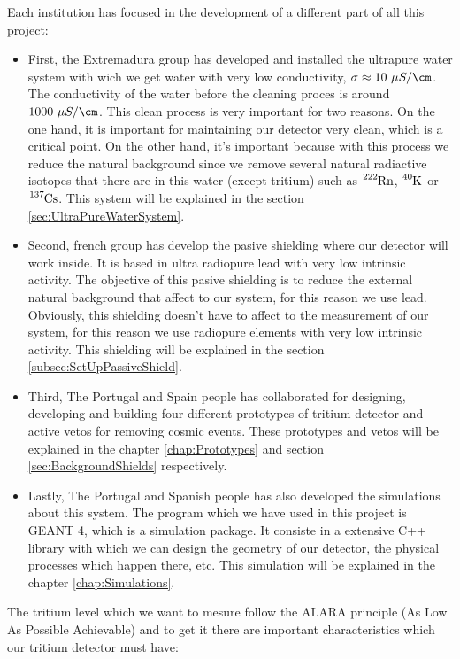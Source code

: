 Each institution has focused in the development of a different part of all this project:
\begin{itemize}
\item{} First, the Extremadura group has developed and installed the ultrapure water system with wich we get water with very low conductivity, $\sigma \approx 10 ~\mu S / \cm$. The conductivity of the water before the cleaning proces is around $ 1000 ~\mu S / \cm$. This clean process is very important for two reasons. On the one hand, it is important for maintaining our detector very clean, which is a critical point. On the other hand, it's important because with this process we reduce the natural background since we remove several natural radiactive isotopes that there are in this water (except tritium) such as $\ce{^{222}Rn}$, $\ce{^{40}K}$ or $\ce{^{137}Cs}$. This system will be explained in the section \ref{sec:UltraPureWaterSystem}.

\item{} Second, french group has develop the pasive shielding where our detector will work inside. It is based in ultra radiopure lead with very low intrinsic activity. The objective of this pasive shielding is to reduce the external natural background that affect to our system, for this reason we use lead. Obviously, this shielding doesn't have to affect to the measurement of our system, for this reason we use radiopure elements with very low intrinsic activity. This shielding will be explained in the section \ref{subsec:SetUpPassiveShield}.

\item{} Third, The Portugal and Spain people has collaborated for designing, developing and building four different prototypes of tritium detector and active vetos for removing cosmic events. These prototypes and vetos will be explained in the chapter \ref{chap:Prototypes} and section \ref{sec:BackgroundShields} respectively.

\item{} Lastly, The Portugal and Spanish people has also developed the simulations about this system. The program which we have used in this project is GEANT 4, which is a simulation package. It consiste in a extensive C++ library with which we can design the geometry of our detector, the physical processes which happen there, etc. This simulation will be explained in the chapter \ref{chap:Simulations}.

\end{itemize}

The tritium level which we want to mesure follow the ALARA principle (As Low As Possible Achievable) and to get it there are important characteristics which our tritium detector must have:

